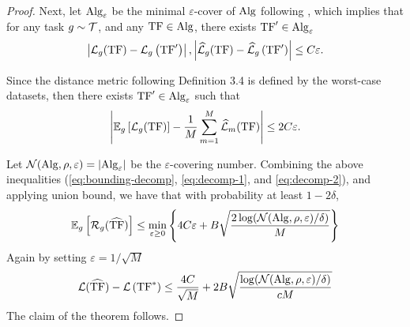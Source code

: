\begin{proof}
Next, let $\mathrm{Alg}_{\varepsilon}$ be the minimal $\varepsilon$-cover of $\mathrm{Alg}$ following , which implies that for any task $g \sim \mathcal{T}$, and any $\mathrm{TF} \in \mathrm{Alg}$, there exists $\mathrm{TF}^{\prime} \in \mathrm{Alg}_{\varepsilon}$
\begin{align}
\left|\mathcal{L}_{g}(\mathrm{TF})-\mathcal{L}_{g}\left(\mathrm{TF}^{\prime}\right)\right|,\left|\widehat{\mathcal{L}}_{g}(\mathrm{TF})-\widehat{\mathcal{L}}_{g}\left(\mathrm{TF}{ }^{\prime}\right)\right| \leq C \varepsilon . \label{eq:decomp-2}
\end{align}

Since the distance metric following Definition 3.4 is defined by the worst-case datasets, then there exists $\mathrm{TF}^{\prime} \in \mathrm{Alg}_{\varepsilon}$ such that
\begin{align*}
\left|\mathbb{E}_{g}\left[\mathcal{L}_{g}(\mathrm{TF})\right]-\frac{1}{M} \sum_{m=1}^M \widehat{\mathcal{L}}_m(\mathrm{TF})\right| \leq 2 C \varepsilon .
\end{align*}


Let $\mathcal{N}(\mathrm{Alg}, \rho, \varepsilon)=\left|\mathrm{Alg}_{\varepsilon}\right|$ be the $\varepsilon$-covering number. Combining the above inequalities (\eqref{eq:bounding-decomp}, \eqref{eq:decomp-1}, and \eqref{eq:decomp-2}), and applying union bound, we have that with probability at least $1-2 \delta$,
\begin{align*}
\mathbb{E}_{g}\left[\mathcal{R}_{g}(\widehat{\mathrm{TF}})\right] \leq \min _{\varepsilon \geq 0}\left\{4 C \varepsilon+B \sqrt{\frac{2 \log (\mathcal{N}(\mathrm{Alg}, \rho, \varepsilon) / \delta)}{M}}\right\}
\end{align*}
Again by setting $\varepsilon = 1/\sqrt{M}$
\begin{align*}
    \mathcal{L}(\widehat{\mathrm{TF}})-\mathcal{L}\left(\mathrm{TF}^*\right)\leq \dfrac{4 C}{\sqrt{M}}+ 2B \sqrt{\frac{\log (\mathcal{N}(\mathrm{Alg}, \rho, \varepsilon) / \delta)}{c M}}
\end{align*}
The claim of the theorem follows.
\end{proof}


